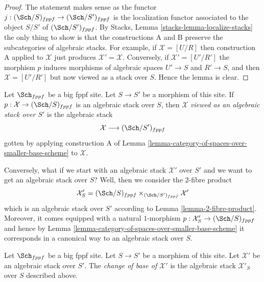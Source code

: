 \begin{proof}
The statement makes sense as the functor
$j : (\Sch/S)_{fppf} \to (\Sch/S')_{fppf}$
is the localization functor associated to the object $S/S'$
of $(\Sch/S')_{fppf}$. By
Stacks, Lemma \ref{stacks-lemma-localize-stacks}
the only thing to show is that the constructions A and B
preserve the subcategories of algebraic stacks.
For example, if $\mathcal{X} = [U/R]$ then construction A
applied to $\mathcal{X}$ just produces
$\mathcal{X}' = \mathcal{X}$. Conversely, if $\mathcal{X}' = [U'/R']$
the morphism $p$ induces morphisms of algebraic spaces
$U' \to S$ and $R' \to S$, and then $\mathcal{X} = [U'/R']$
but now viewed as a stack over $S$. Hence the lemma is clear.
\end{proof}

\begin{definition}
\label{definition-viewed-as}
Let $\Sch_{fppf}$ be a big fppf site.
Let $S \to S'$ be a morphism of this site.
If $p : \mathcal{X} \to (\Sch/S)_{fppf}$
is an algebraic stack over $S$, then
$\mathcal{X}$ {\it viewed as an algebraic stack over $S'$}
is the algebraic stack
$$
\mathcal{X} \longrightarrow (\Sch/S')_{fppf}
$$
gotten by applying construction A of
Lemma \ref{lemma-category-of-spaces-over-smaller-base-scheme}
to $\mathcal{X}$.
\end{definition}

\noindent
Conversely, what if we start with an algebraic stack $\mathcal{X}'$
over $S'$ and we want to get an algebraic stack over $S$?
Well, then we consider the $2$-fibre product
$$
\mathcal{X}'_S
=
(\Sch/S)_{fppf} \times_{(\Sch/S')_{fppf}} \mathcal{X}'
$$
which is an algebraic stack over $S'$ according to
Lemma \ref{lemma-2-fibre-product}.
Moreover, it comes equipped with a natural $1$-morphism
$p : \mathcal{X}'_S \to (\Sch/S)_{fppf}$ and hence by
Lemma \ref{lemma-category-of-spaces-over-smaller-base-scheme}
it corresponds in a canonical way to an algebraic stack over $S$.

\begin{definition}
\label{definition-change-of-base}
Let $\Sch_{fppf}$ be a big fppf site.
Let $S \to S'$ be a morphism of this site.
Let $\mathcal{X}'$ be an algebraic stack over $S'$.
The {\it change of base of $\mathcal{X}'$} is the
algebraic stack $\mathcal{X}'_S$ over $S$ described above.
\end{definition}










